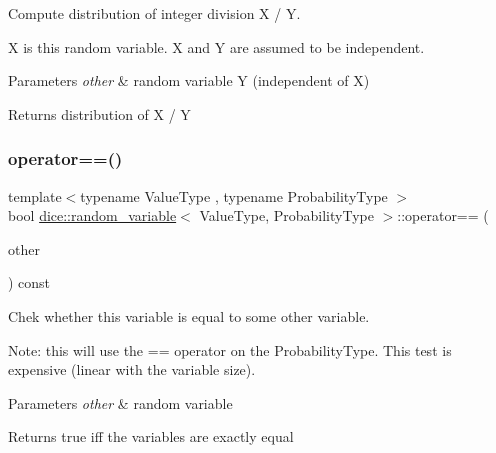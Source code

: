 Compute distribution of integer division X / Y. 

X is this random variable. X and Y are assumed to be independent.


\begin{DoxyParams}{Parameters}
{\em other} & random variable Y (independent of X) \\
\hline
\end{DoxyParams}
\begin{DoxyReturn}{Returns}
distribution of X / Y 
\end{DoxyReturn}
\mbox{\label{classdice_1_1random__variable_abe0ae85dfb81c7f5b7c921db588eda17}} 
\subsubsection{\texorpdfstring{operator==()}{operator==()}}
{\footnotesize\ttfamily template$<$typename Value\+Type , typename Probability\+Type $>$ \\
bool \mbox{\hyperlink{classdice_1_1random__variable}{dice\+::random\+\_\+variable}}$<$ Value\+Type, Probability\+Type $>$\+::operator== (\begin{DoxyParamCaption}\item[{const \mbox{\hyperlink{classdice_1_1random__variable}{random\+\_\+variable}}$<$ Value\+Type, Probability\+Type $>$ \&}]{other }\end{DoxyParamCaption}) const\hspace{0.3cm}{\ttfamily [inline]}}



Chek whether this variable is equal to some other variable. 

Note\+: this will use the == operator on the Probability\+Type. This test is expensive (linear with the variable size).


\begin{DoxyParams}{Parameters}
{\em other} & random variable\\
\hline
\end{DoxyParams}
\begin{DoxyReturn}{Returns}
true iff the variables are exactly equal 
\end{DoxyReturn}
\mbox{\label{classdice_1_1random__variable_a0759c25151ebb5618e2ff0ecbb91c80d}} 
